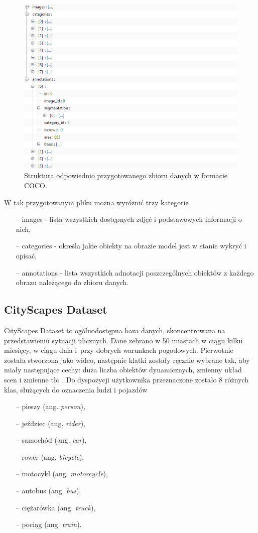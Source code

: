 \begin{figure}[H]
    \centering
    \includegraphics[width=0.7\linewidth]{Obrazy/Rozdzial04/coco.png}
    \caption{Struktura odpowiednio przygotowanego zbioru danych w formacie COCO.}
    \label{fig:coco}
\end{figure}

\hspace{0.5cm}
W tak przygotowanym pliku można wyróżnić trzy kategorie
\begin{itemize}
    \item[--] images - lista wszystkich dostępnych zdjęć i podstawowych informacji o nich,
    \item[--] categories - określa jakie obiekty na obrazie model jest w stanie wykryć i opisać,
    \item[--] annotations - lista wszystkich adnotacji poszczególnych obiektów z każdego obrazu należącego do zbioru danych.
\end{itemize}

\subsection{CityScapes Dataset}

\hspace{0.5cm}
CityScapes Dataset \cite{Cordts2016Cityscapes} to ogólnodostępna baza danych, skoncentrowana na przedstawieniu sytuacji ulicznych. Dane zebrano w 50 miastach w ciągu kilku miesięcy, w ciągu dnia i~przy dobrych warunkach pogodowych. Pierwotnie została stworzona jako wideo, następnie klatki zostały ręcznie wybrane tak, aby miały następujące cechy: duża liczba obiektów dynamicznych, zmienny układ scen i zmienne tło \cite{CityscapesPapers}. Do dyspozycji użytkownika przeznaczone zostało 8 różnych klas, służących do oznaczenia ludzi i pojazdów
\begin{itemize}
    \item[--] pieszy (ang. \emph{person}),
    \item[--] jeździec (ang. \emph{rider}),
    \item[--] samochód (ang. \emph{car}),
    \item[--] rower (ang. \emph{bicycle}),
    \item[--] motocykl (ang. \emph{motorcycle}),
    \item[--] autobus (ang. \emph{bus}),
    \item[--] ciężarówka (ang. \emph{truck}),
    \item[--] pociąg (ang. \emph{train}).
\end{itemize}


